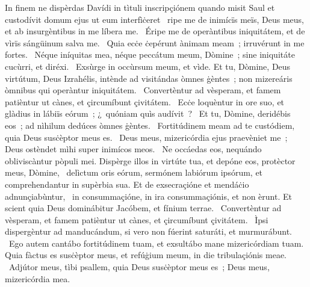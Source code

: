 { In finem ne dispèrdas Davídi in tìtuli inscripçiónem quando misit Saul et custodívit domum ejus ut eum interfìċeret}
{%
~ripe me de inimícïs meïs, Deus meus, et ab insurgèntibus in me líbera me. 
~Éripe me de operàntibus iniquitátem, et de vìrïs sángüinum salva me. 
~Quia ecċe ċepérunt ànimam meam~; irruvérunt in me fortes. 
~Néque iníquitas mea, néque peccátum meum, Dòmine~; sine iniquitáte cucùrri, et diréxi. 
~Exsùrge in occùrsum meum, et vìde. Et tu, Dòmine, Deus virtútum, Deus Izrahélis, intènde ad visitándas òmnes ġèntes~; non mizereáris òmnibus qui operàntur iniquitátem. 
~Convertèntur ad vèsperam, et famem patièntur ut cànes, et çircumíbunt çivitátem. 
~Ecċe loquèntur in ore suo, et glàdius in lábiïs eórum~; ¿~quóniam quìs audívit~? 
~Et tu, Dòmine, deridébis eos~; ad nìhilum dedúces òmnes ġèntes. 
~Fortitúdinem meam ad te custódiem, quia Deus susċèptor meus es. 
~Deus meus, mizericórdia ejus praevèniet me~; Deus ostèndet mìhi super inimícos meos. 
~Ne occáedas eos, nequándo obliviscàntur pòpuli mei. Dispèrge illos in virtúte tua, et depóne eos, protèctor meus, Dòmine, 
~delìctum oris eórum, sermónem labiórum ipsórum, et comprehendantur in supèrbia sua. Et de exsecraçióne et mendáċio adnunçiabùntur, 
~in consummaçióne, in ira consummaçiónis, et non èrunt. Et scient quia Deus dominábitur Jacóbem, et fínium terrae. 
~Convertèntur ad vèsperam, et famem patièntur ut cànes, et çircumíbunt çivitátem. 
~Ìpsi dispergèntur ad manducándum, si vero non fúerint saturáti, et murmurábunt. 
~Ego autem cantábo fortitúdinem tuam, et exsultábo mane mizericórdiam tuam. Quia fàctus es susċèptor meus, et refúġium meum, in die tribulaçiónis meae. 
~Adjútor meus, tìbi psallem, quia Deus susċèptor meus es~; Deus meus, mizericórdia mea. 
}
